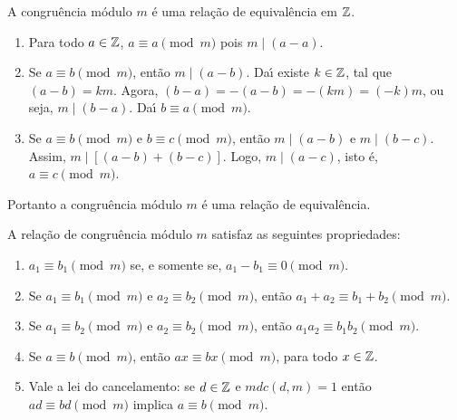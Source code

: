 \documentclass{beamer}
\begin{document}
    \begin{frame}
        \begin{proposicao}
            A congru{\^e}ncia m{\'o}dulo $m$ {\'e} uma rela{\c c}{\~a}o de equival{\^e}ncia em $\mathbb{Z}$.
        \end{proposicao}
        \begin{prova}
            \begin{enumerate}[label={\roman*})]
                \item Para todo $a \in \mathbb{Z}$, $a\equiv a\pmod{m}$ pois $m\mid (a-a)$.
                \item Se $a\equiv b\pmod{m}$, ent{\~a}o $m\mid (a - b)$. Da{\'\i} existe $k \in \mathbb{Z}$, tal que $(a - b) = km$. Agora, $(b - a) = -(a - b) = -(km) = (-k)m$, ou seja, $m \mid (b - a)$. Da{\'\i} $b\equiv a \pmod{m}$.
                \item Se $a\equiv b\pmod{m}$ e $b\equiv c\pmod{m}$, ent{\~a}o $m\mid (a-b)$ e $m\mid (b-c)$. Assim, $m\mid [(a-b)+(b-c)]$. Logo, $m\mid (a-c)$, isto {\'e}, $a\equiv c\pmod{m}$.
            \end{enumerate}

            Portanto a congru{\^e}ncia m{\'o}dulo $m$ {\'e} uma rela{\c c}{\~a}o de equival{\^e}ncia.
        \end{prova}
    \end{frame}
    \begin{frame}
        \begin{teorema}
            A rela{\c c}{\~a}o de congru{\^e}ncia m{\'o}dulo $m$ satisfaz as seguintes propriedades:
            \begin{enumerate}[label={\roman*})]
                \item $a_{1}\equiv b_{1}\pmod{m}$ se, e somente se, $a_{1}-b_{1}\equiv 0\pmod{m}$.
                \item Se $a_{1}\equiv b_{1}\pmod{m}$ e $a_{2}\equiv b_{2}\pmod{m}$, ent{\~a}o $a_{1}+a_{2}\equiv b_{1}+b_{2}\pmod{m}$.
                \item Se $a_{1}\equiv b_{2}\pmod{m}$ e $a_{2}\equiv b_{2}\pmod{m}$, ent{\~a}o $a_{1}a_{2}\equiv b_{1}b_{2}\pmod{m}$.\label{item_provado}
                \item Se $a\equiv b\pmod{m}$, ent{\~a}o $ax\equiv bx\pmod{m}$, para todo $x \in \mathbb{Z}$.
                \item Vale a lei do cancelamento: se $d \in \mathbb{Z}$ e $mdc(d,m) = 1$ ent{\~a}o $ad \equiv bd \pmod{m}$ implica $a\equiv b \pmod{m}$.
            \end{enumerate}
        \end{teorema}
    \end{frame}
\end{document}
